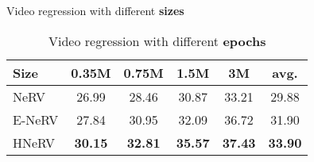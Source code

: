 \documentclass[10pt,twocolumn,letterpaper]{article}
\begin{document}
\begin{table*}[t!]
\begin{minipage}{0.49\linewidth}
\centering
\caption{Video regression with different \textbf{sizes}}
\label{tab:bunny-size}
\vspace{-0.5em}
    \begin{tabular}{@{}l|cccc|c@{}}
    \toprule
    Size   & 0.35M & 0.75M & 1.5M  & 3M    & avg. \\
    \midrule
    NeRV   & 26.99 & 28.46 & 30.87 & 33.21 & 29.88                   \\
    E-NeRV & 27.84 & 30.95 & 32.09 & 36.72 & 31.90                   \\
    HNeRV  & \textbf{30.15} & \textbf{32.81} & \textbf{35.57} &\textbf{ 37.43 }& \textbf{33.90}                  \\
    \bottomrule
    \end{tabular}
\end{minipage} 
\hfill
\begin{minipage}{0.49\linewidth}
\caption{Video regression with different \textbf{epochs}} \label{tab:bunny-epoch}
\vspace{-0.5em}
\end{minipage} 
\end{table*}
\end{document}
